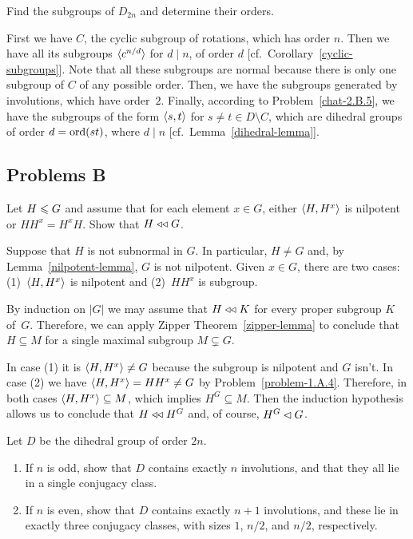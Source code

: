 \begin{probl}
    Find the subgroups of $D_{2n}$ and determine their orders.
\end{probl}

\begin{solution} First we have $C$, the cyclic subgroup of rotations, which has order $n$. Then we have all its subgroups $\langle c^{n/d}\rangle$ for $d\mid n$, of order $d$ [cf.~Corollary~\ref{cyclic-subgroups}]. Note that all these subgroups are normal because there is only one subgroup of $C$ of any possible order. Then, we have the subgroups generated by involutions, which have order~$2$. Finally, according to Problem~\ref{chat-2.B.5}, we have the subgroups of the form $\langle s,t\rangle$ for $s\ne t\in D\setminus C$, which are dihedral groups of order $d={\rm ord}(st)$, where $d\mid n$ [cf.~Lemma~\ref{dihedral-lemma}].  \end{solution}


\subsection{Problems B}

\begin{probl}
    Let\/ $H\leqslant G$ and assume that for each element\/ $x\in G$, either\/ $\langle H, H^x\rangle$ is nilpotent or\/ $HH^x=H^xH$. Show that\/ $H\mathrel{\triangleleft\triangleleft} G$.
\end{probl}

\begin{solution} Suppose that $H$ is not subnormal in $G$. In particular, $H\ne G$ and, by Lemma~\ref{nilpotent-lemma}, $G$ is not nilpotent. Given $x\in G$, there are two cases: (1)~$\langle H,H^x\rangle$ is nilpotent and (2)~$HH^x$ is subgroup.

By induction on $|G|$ we may assume that $H\mathrel{\triangleleft\triangleleft} K$ for every proper subgroup $K$ of~$G$. Therefore, we can apply Zipper Theorem~\ref{zipper-lemma} to conclude that $H\subseteq M$ for a single maximal subgroup $M\varsubsetneq G$. 

In case (1) it is $\langle H,H^x\rangle\ne G$ because the subgroup is nilpotent and $G$ isn't. In case (2) we have $\langle H,H^x\rangle=HH^x\ne G$ by Problem~\ref{problem-1.A.4}. Therefore, in both cases $\langle H,H^x\rangle\subseteq M$, which implies $H^G\subseteq M$. Then the induction hypothesis allows us to conclude that $H\mathrel{\triangleleft\triangleleft} H^G$ and, of course, $H^G\lhd G$.  \end{solution}

\begin{probl}\label{problem-2.B.2}
    Let\/ $D$ be the dihedral group of order\/ $2n$.
    \begin{enumerate}[\rm a)]
    \item If\/ $n$ is odd, show that\/ $D$ contains exactly\/ $n$ involutions, and that they all lie in a single conjugacy class.
    \item If\/ $n$ is even, show that\/ $D$ contains exactly\/ $n + 1$ involutions, and these lie in exactly three conjugacy classes, with sizes\/ $1$, $n/2$, and\/ $n/2$, respectively.
    \end{enumerate}
\end{probl}

